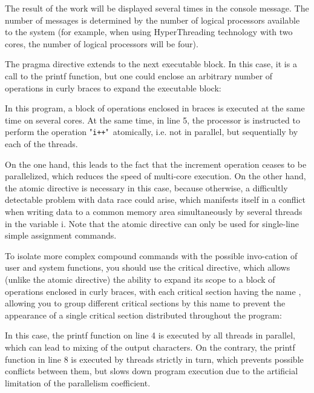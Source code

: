 {	\begin{figure}[H]
		
	\end{figure}
	\par The result of the work will be displayed several times in the console message. The number of messages is determined by the number of logical processors available to the system (for example, when using HyperThreading technology with two cores, the number of logical processors will be four). 
	\par The pragma directive extends to the next executable block. In this case, it is a call to the printf function, but one could enclose an arbitrary number of operations in curly braces to expand the executable block:
	\begin{figure}[H]
		
	\end{figure}
	In this program, a block of operations enclosed in braces is executed at the same time on several cores. At the same time, in line 5, the processor is instructed to perform the operation "\texttt{i++}"\ atomically, i.e. not in parallel, but sequentially by each of the threads.
	\par On the one hand, this leads to the fact that the increment operation ceases to be parallelized, which reduces the speed of multi-core execution. On the other hand, the atomic directive is necessary in this case, because otherwise, a difficultly detectable problem with data race could arise, which manifests itself in a conflict when writing data to a common memory area simultaneously by several threads in the variable i. Note that the atomic directive can only be used for single-line simple assignment commands.
	\par To isolate more complex compound commands with the possible invo-cation of user and system functions, you should use the critical directive, which allows (unlike the atomic directive) the ability to expand its scope to a block of operations enclosed in curly braces, with each critical section having the name , allowing you to group different critical sections by this name to prevent the appearance of a single critical section distributed throughout the program:
	\begin{figure}[H]
		
	\end{figure}
	\par In this case, the printf function on line 4 is executed by all threads in parallel, which can lead to mixing of the output characters. On the contrary, the printf function in line 8 is executed by threads strictly in turn, which prevents possible conflicts between them, but slows down program execution due to the artificial limitation of the parallelism coefficient.
}
